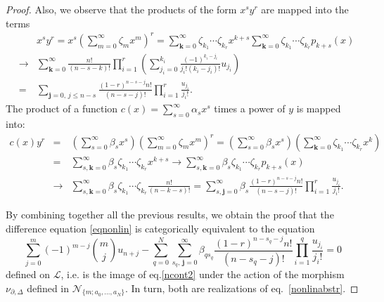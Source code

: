 \documentclass[10pt]{amsart}
\numberwithin{equation}{section}
\theoremstyle{definition}
\begin{document}
\begin{proof}
Also, we observe that the products of the form $x^{s} y^{r}$ are mapped
into the terms
\begin{eqnarray}
\label{eq:3.25}
&& x^{s}y^{r}=x^{s}\left (\sum _{m=0}^{\infty}\zeta _{m} x^{m}\right )^{r}=
\sum _{\mathbf{k}=0}^{\infty} \zeta _{k_{1}}\cdots \zeta _{k_{r}} x^{k+s}
\sum _{\mathbf{k}=0}^{\infty} \zeta _{k_{1}}\cdots \zeta _{k_{r}} p_{k+s}(x)
\\
&\to & \sum _{\mathbf{k}=0}^{\infty} \frac{n!}{(n-s-k)!}\prod _{i=1}^{r}
\left (\sum _{j_{i}=0}^{k_{i}}
\frac{(-1)^{k_{i}-j_{i}}}{j_{i}!(k_{i}-j_{i})!}u_{j_{i}}\right )
\nonumber
\\
& = & \sum _{\mathbf{j}=0,\,j\le n-s}
\frac{(1-r)^{n-s -j } n!}{ (n-s-j)! }\prod _{i=1}^{r}
\frac{u_{j_{i}}}{j_{i}!}.
\nonumber
\end{eqnarray}
The product of a function
$c(x)=\sum _{s=0}^{\infty} \alpha _{s}x^{s}$ times a power of $y$ is mapped
into:
\begin{eqnarray}
c(x)y^{r}&=&\left (\sum _{s=0}^{\infty}\beta _{s} x^{s}\right )
\left (\sum _{m=0}^{\infty}\zeta _{m} x^{m}\right )^{r}=\left (\sum _{s=0}^{
\infty}\beta _{s}x^{s}\right ) \left (\sum _{\mathbf{k}=0}^{\infty}
\zeta _{k_{1}}\cdots \zeta _{k_{r}} x^{k}\right )
\nonumber
\\
&= &\sum _{s,\mathbf{k}=0}^{\infty} \beta _{s} \zeta _{k_{1}}\cdots
\zeta _{k_{r}} x^{k+s} \to \sum _{s,\mathbf{k}=0}^{\infty} \beta _{s}
\zeta _{k_{1}}\cdots \zeta _{k_{r}} p_{k+s}(x)
\nonumber
\\
&\to & \sum _{s,\mathbf{k}=0}^{\infty} \beta _{s} \zeta _{k_{1}}
\cdots \zeta _{k_{r}} \frac{n!}{(n-k-s)!} = \sum _{s,\mathbf{j}=0}^{
\infty}\beta _{s}\frac{(1-r)^{n-s -j } n!}{ (n-s-j)! }\prod _{i=1}^{r}
\frac{u_{j_{i}}}{j_{i}!}.
\label{eq5.26}
\end{eqnarray}

By combining together all the previous results, we obtain the proof that
the difference equation  \eqref{eqnonlin} is categorically equivalent to
the equation
\begin{equation}
\sum _{j=0}^{m}(-1)^{m-j}\binom{m}{j}u_{n+j}-\sum _{q=0}^{N} \sum _{s_{q},
\,\mathbf{j}=0}^{\infty}\beta _{qs_{q}}
\frac{(1-r)^{n-s_{q}-j } n!}{ (n-s_{q}-j)! }\prod _{i=1}^{q}
\frac{u_{j_{i}}}{j_{i}!}=0
\label{eq5.27}
\end{equation}
defined on $\mathcal{L}$, i.e. is the image of eq.\eqref{ncont2} under
the action of the morphism $\nu _{\partial ,\Delta}$ defined in
$\mathcal{N}_{\{m; a_{0},\ldots , a_{N}\}}$. In turn, both are realizations
of  eq.~\eqref{nonlinabstr}.


\end{proof}
\end{document}
